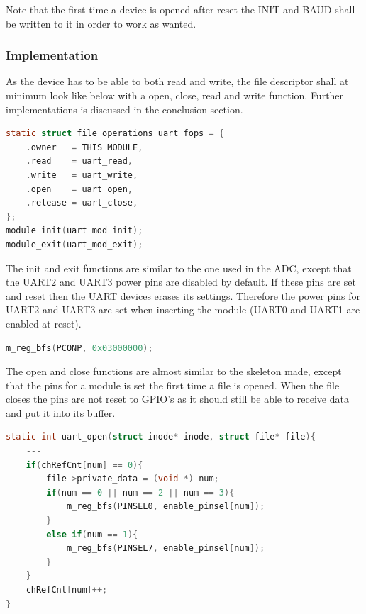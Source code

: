 Note that the first time a device is opened after reset the INIT and BAUD shall be written to it in order to work as wanted. 
%
\subsubsection{Implementation}
As the device has to be able to both read and write, the file descriptor shall at minimum look like below with a open, close, read and write function. Further implementations is discussed in the conclusion section.
\begin{lstlisting}[language=c]
static struct file_operations uart_fops = {
	.owner   = THIS_MODULE,
	.read	 = uart_read,
	.write   = uart_write,
	.open    = uart_open,
	.release = uart_close,
};
module_init(uart_mod_init);
module_exit(uart_mod_exit);
\end{lstlisting}

The init and exit functions are similar to the one used in the ADC, except that the UART2 and UART3 power pins are disabled by default. If these pins are set and reset then the UART devices erases its settings. Therefore the power pins for UART2 and UART3 are set when inserting the module (UART0 and UART1 are enabled at reset).
\begin{lstlisting}[language=c]
m_reg_bfs(PCONP, 0x03000000);
\end{lstlisting}

The open and close functions are almost similar to the skeleton made, except that the pins for a module is set the first time a file is opened. When the file closes the pins are not reset to GPIO's as it should still be able to receive data and put it into its buffer. 
\begin{lstlisting}[language=c]
static int uart_open(struct inode* inode, struct file* file){
	---
	if(chRefCnt[num] == 0){
		file->private_data = (void *) num;
		if(num == 0 || num == 2 || num == 3){
			m_reg_bfs(PINSEL0, enable_pinsel[num]);
		}
		else if(num == 1){
			m_reg_bfs(PINSEL7, enable_pinsel[num]);
		}
	}
	chRefCnt[num]++;
}
\end{lstlisting}

